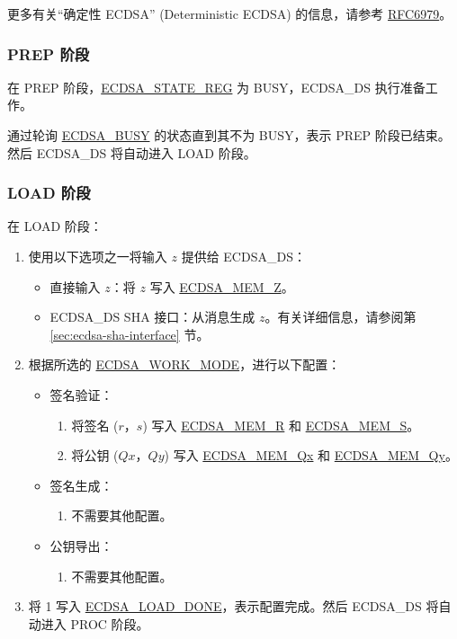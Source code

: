 \documentclass[main\_\_CN.tex]{subfiles}
\begin{document}
\begin{tiplisting}
更多有关“确定性 ECDSA” (Deterministic ECDSA) 的信息，请参考 \href{https://www.rfc-editor.org/rfc/rfc6979}{RFC6979}。
\end{tiplisting}

\subsubsection{PREP 阶段}

在 PREP 阶段，\hyperref[regdesc:ECDSASTATEREG]{ECDSA\_STATE\_REG} 为 BUSY，ECDSA\_DS 执行准备工作。

通过轮询 \hyperref[fielddesc:ECDSABUSY]{ECDSA\_BUSY} 的状态直到其不为 BUSY，表示 PREP 阶段已结束。然后 ECDSA\_DS 将自动进入 LOAD 阶段。

\subsubsection{LOAD 阶段}
在 LOAD 阶段：

\begin{enumerate}
	\item 使用以下选项之一将输入 $z$ 提供给 ECDSA\_DS：
	      \begin{itemize}
		      \item 直接输入 $z$：将 $z$ 写入 \hyperref[tab:ecdsa-memory]{ECDSA\_MEM\_Z}。
		      \item ECDSA\_DS SHA 接口：从消息生成 $z$。有关详细信息，请参阅第 \ref{sec:ecdsa-sha-interface} 节。
	      \end{itemize}
	\item 根据所选的 \hyperref[fielddesc:ECDSAWORKMODE]{ECDSA\_WORK\_MODE}，进行以下配置：
	      \begin{itemize}
		      \item 签名验证：
		            \begin{enumerate}
			            \item 将签名 ($r$，$s$) 写入 \hyperref[tab:ecdsa-memory]{ECDSA\_MEM\_R} 和 \hyperref[tab:ecdsa-memory]{ECDSA\_MEM\_S}。
			            \item 将公钥 ($Qx$，$Qy$) 写入 \hyperref[tab:ecdsa-memory]{ECDSA\_MEM\_Qx} 和 \hyperref[tab:ecdsa-memory]{ECDSA\_MEM\_Qy}。
		            \end{enumerate}
		      \item 签名生成：
		            \begin{enumerate}
			            \item 不需要其他配置。
		            \end{enumerate}
                \item 公钥导出：
		            \begin{enumerate}
                            \item 不需要其他配置。
		            \end{enumerate}
	      \end{itemize}
	\item 将 1 写入 \hyperref[fielddesc:ECDSALOADDONE]{ECDSA\_LOAD\_DONE}，表示配置完成。然后 ECDSA\_DS 将自动进入 PROC 阶段。
\end{enumerate}
\end{document}
